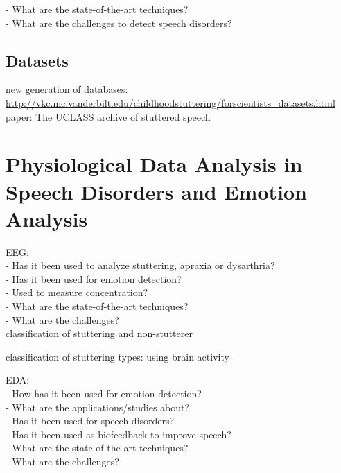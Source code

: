 -	What are the state-of-the-art techniques?\\
-	What are the challenges to detect speech disorders?\\

\subsection{Datasets}
new generation of databases: \cite{DouglasCowie2003}\\

\url{http://vkc.mc.vanderbilt.edu/childhoodstuttering/forscientists_datasets.html}\\

paper: The UCLASS archive of stuttered speech\\

\section{Physiological Data Analysis in Speech Disorders and Emotion Analysis}

EEG:\\
-	Has it been used to analyze stuttering, apraxia or dysarthria?\\
-	Has it been used for emotion detection?\\
-	Used to measure concentration?\\
-	What are the state-of-the-art techniques?\\
-	What are the challenges?\\

classification of stuttering and non-stutterer \cite{saltuklaroglu2017eeg}

classification of stuttering types: using brain activity\cite{Jiang2012}

EDA:\\
-	How has it been used for emotion detection?\\
-	What are the applications/studies about?\\
-	Has it been used for speech disorders?\\
-	Has it been used as biofeedback to improve speech?\\
-	What are the state-of-the-art techniques?\\
-	What are the challenges?\\





